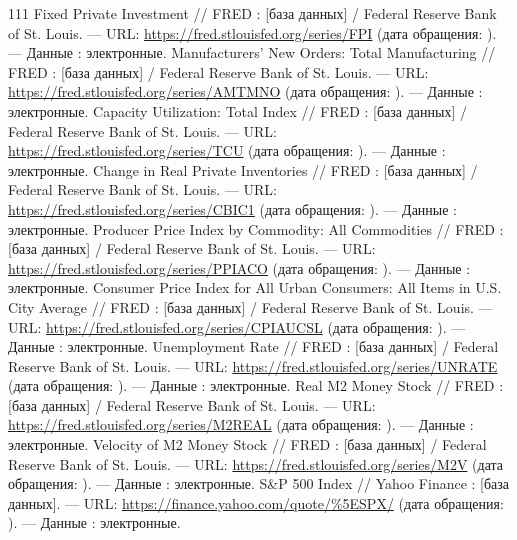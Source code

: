 \begin{RaggedRight}
\begin{thebibliography}{111}
     \hypertarget{bib:FRED-FPI}{} Fixed Private Investment // FRED : [база данных] / Federal Reserve Bank of St. Louis. --- URL: \url{https://fred.stlouisfed.org/series/FPI} (дата обращения: \bibaccessdate). --- Данные : электронные.
     \hypertarget{bib:FRED-AMTMNO}{} Manufacturers’ New Orders: Total Manufacturing // FRED : [база данных] / Federal Reserve Bank of St. Louis. --- URL: \url{https://fred.stlouisfed.org/series/AMTMNO} (дата обращения: \bibaccessdate). --- Данные : электронные.
     \hypertarget{bib:FRED-TCU}{} Capacity Utilization: Total Index // FRED : [база данных] / Federal Reserve Bank of St. Louis. --- URL: \url{https://fred.stlouisfed.org/series/TCU} (дата обращения: \bibaccessdate). --- Данные : электронные.
     \hypertarget{bib:FRED-CBIC1}{} Change in Real Private Inventories // FRED : [база данных] / Federal Reserve Bank of St. Louis. --- URL: \url{https://fred.stlouisfed.org/series/CBIC1} (дата обращения: \bibaccessdate). --- Данные : электронные.
     \hypertarget{bib:FRED-PPIACO}{} Producer Price Index by Commodity: All Commodities // FRED : [база данных] / Federal Reserve Bank of St. Louis. --- URL: \url{https://fred.stlouisfed.org/series/PPIACO} (дата обращения: \bibaccessdate). --- Данные : электронные.
     \hypertarget{bib:FRED-CPIAUCSL}{} Consumer Price Index for All Urban Consumers: All Items in U.S. City Average // FRED : [база данных] / Federal Reserve Bank of St. Louis. --- URL: \url{https://fred.stlouisfed.org/series/CPIAUCSL} (дата обращения: \bibaccessdate). --- Данные : электронные.
     \hypertarget{bib:FRED-UNRATE}{} Unemployment Rate // FRED : [база данных] / Federal Reserve Bank of St. Louis. --- URL: \url{https://fred.stlouisfed.org/series/UNRATE} (дата обращения: \bibaccessdate). --- Данные : электронные.
     \hypertarget{bib:FRED-M2REAL}{} Real M2 Money Stock // FRED : [база данных] / Federal Reserve Bank of St. Louis. --- URL: \url{https://fred.stlouisfed.org/series/M2REAL} (дата обращения: \bibaccessdate). --- Данные : электронные.
     \hypertarget{bib:FRED-M2V}{} Velocity of M2 Money Stock // FRED : [база данных] / Federal Reserve Bank of St. Louis. --- URL: \url{https://fred.stlouisfed.org/series/M2V} (дата обращения: \bibaccessdate). --- Данные : электронные.
     \hypertarget{bib:SP500}{} S\&P 500 Index // Yahoo Finance : [база данных]. --- URL: \url{https://finance.yahoo.com/quote/%5ESPX/} (дата обращения: \bibaccessdate). --- Данные : электронные.

\end{thebibliography}
\end{RaggedRight}
